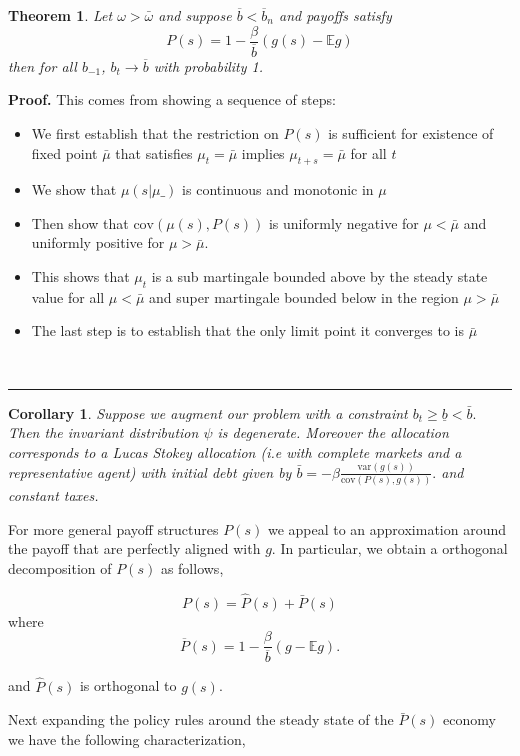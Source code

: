 \documentclass[thmsb,11pt]{article}
\newtheorem{theorem}{Theorem}
\newtheorem{corollary}{Corollary}
\newcommand{\var}{\mathrm{var}}
\newcommand{\cov}{\mathrm{cov}}
\newenvironment{proof}[1][Proof]{\noindent \textbf{#1.} }{\  \rule{0.5em}{0.5em}}
\begin{document}
 
\begin{theorem}
Let $\omega>\bar{\omega}$ and suppose $\overline b < \overline b_n$ and payoffs satisfy
\[P(s) = 1- \frac{\beta}{\overline b}(g(s) - \mathbb{E} g)\] 
			 then for all $b_{-1}$, $b_t\rightarrow \overline b$ with probability 1. 
\end{theorem}

\begin{proof}
This comes from showing a sequence of steps: 
\begin{itemize}
\item We first establish that the restriction on $P(s)$ is sufficient for existence of fixed point $\bar{\mu}$ that satisfies $\mu_{t}=\bar{\mu}$ implies $\mu_{t+s}=\bar{\mu}$ for all $t$
\item We show that $\mu(s|\mu\_)$ is continuous and monotonic in $\mu$
\item Then show that $\cov(\mu(s),P(s))$ is uniformly negative for $\mu<\bar{\mu}$ and uniformly positive for $\mu>\bar{\mu}$.
\item This shows that $\mu_t$ is a sub martingale bounded above by the steady state value for all $\mu<\bar{\mu}$ and super martingale bounded below in the region $\mu>\bar{\mu}$
\item The last step is to establish that the only limit point it converges to is $\bar{\mu}$
\end{itemize}
\end{proof}


\begin{corollary} Suppose we augment our problem with a constraint $b_{t}\geq \underline{b}<\bar{b}.$ Then the invariant distribution $\psi$ is degenerate.  Moreover the allocation corresponds to a Lucas Stokey allocation (i.e with complete markets and a representative agent) with initial debt given by $\bar{b}=-\beta\frac{\var(g(s))}{\cov(P(s),g(s))}.$ and constant taxes.

\end{corollary}


For more general payoff structures $P(s)$ we appeal to an approximation around the payoff that are perfectly aligned with $g$. In particular, we obtain a orthogonal decomposition of $P(s)$ as follows,

\[P(s)=\hat{P}(s)+\bar{P}(s)\] where
\[
	\overline{P}(s) = 1- \frac{\beta}{\overline b}( g - \mathbb{E} g).
\]  

and $\hat{P}(s)$ is orthogonal to $g(s)$. 

Next expanding the policy rules around the steady state of the $\bar{P}(s)$ economy we have the following characterization,
	
\end{document}

